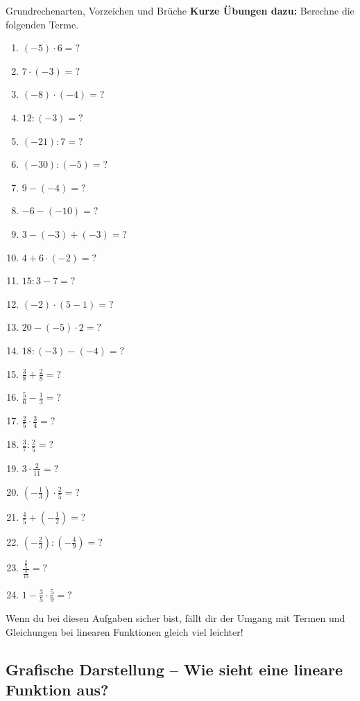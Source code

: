 \begin{erinnerungsboxumgebung}{Grundrechenarten, Vorzeichen und Brüche}
\textbf{Kurze Übungen dazu:}
Berechne die folgenden Terme.
\begin{multicols}{3}
\begin{enumerate}[label=(\alph*)]
    \item $(-5) \cdot 6 = ?$
    \item $7 \cdot (-3) = ?$
    \item $(-8) \cdot (-4) = ?$
    \item $12 : (-3) = ?$
    \item $(-21) : 7 = ?$
    \item $(-30) : (-5) = ?$
    \item $9 - (-4) = ?$
    \item $-6 - (-10) = ?$
    \item $3 - (-3) + (-3) = ?$
    \item $4 + 6 \cdot (-2) = ?$
    \item $15 : 3 - 7 = ?$
    \item $(-2) \cdot (5 - 1) = ?$
    \item $20 - (-5) \cdot 2 = ?$
    \item $18 : (-3) - (-4) = ?$
    \item $\frac{3}{8} + \frac{2}{8} = ?$
    \item $\frac{5}{6} - \frac{1}{3} = ?$
    \item $\frac{2}{5} \cdot \frac{3}{4} = ?$
    \item $\frac{3}{7} : \frac{2}{5} = ?$
    \item $3 \cdot \frac{2}{11} = ?$
    \item $(-\frac{1}{3}) \cdot \frac{2}{5} = ?$
    \item $\frac{4}{5} + (-\frac{1}{2}) = ?$
    \item $(-\frac{2}{3}) : (-\frac{4}{9}) = ?$
    \item $\frac{\frac{2}{5}}{\frac{3}{10}} = ?$
    \item $1 - \frac{3}{5} \cdot \frac{5}{9} = ?$
\end{enumerate}
\end{multicols}

Wenn du bei diesen Aufgaben sicher bist, fällt dir der Umgang mit Termen und Gleichungen bei linearen Funktionen gleich viel leichter!
\end{erinnerungsboxumgebung}


\subsection{Grafische Darstellung – Wie sieht eine lineare Funktion aus?}

